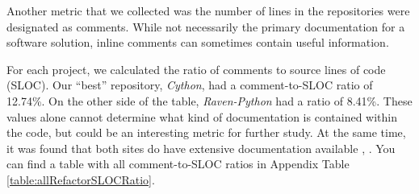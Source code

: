 Another metric that we collected was the number of lines in the repositories were designated as comments. While not necessarily the primary documentation for a software solution, inline comments can sometimes contain useful information.

For each project, we calculated the ratio of comments to source lines of code (SLOC). Our ``best'' repository, \emph{Cython}, had a comment-to-SLOC ratio of 12.74\%. On the other side of the table, \emph{Raven-Python} had a ratio of 8.41\%. These values alone cannot determine what kind of documentation is contained within the code, but could be an interesting metric for further study. At the same time, it was found that both sites do have extensive documentation available \cite{docs:cython}, \cite{docs:raven-python}. You can find a table with all comment-to-SLOC ratios in Appendix Table \ref{table:allRefactorSLOCRatio}.
